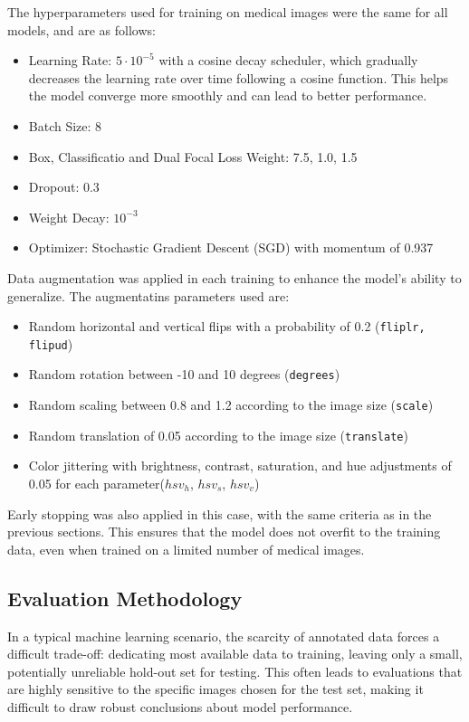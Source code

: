 The hyperparameters used for training on medical images were the same for all models, and are as follows:
\begin{itemize}
    \item Learning Rate: $5 \cdot 10^{-5}$ with a cosine decay scheduler, which gradually decreases the learning rate over time following a cosine function. This helps the model converge more smoothly and can lead to better performance.
    \item Batch Size: 8
    \item Box, Classificatio and Dual Focal Loss Weight: 7.5, 1.0, 1.5
    \item Dropout: 0.3
    \item Weight Decay: $10^{-3}$
    \item Optimizer: Stochastic Gradient Descent (SGD) with momentum of 0.937
\end{itemize}

Data augmentation was applied in each training to enhance the model's ability to generalize. The augmentatins parameters used are:
\begin{itemize}
    \item Random horizontal and vertical flips with a probability of 0.2 (\texttt{fliplr, flipud})
    \item Random rotation between -10 and 10 degrees (\texttt{degrees})
    \item Random scaling between 0.8 and 1.2 according to the image size (\texttt{scale})
    \item Random translation of 0.05 according to the image size (\texttt{translate})
    \item Color jittering with brightness, contrast, saturation, and hue adjustments of 0.05 for each parameter(\texttt{$hsv_h$}, \texttt{$hsv_s$}, \texttt{$hsv_v$}) 
\end{itemize}
Early stopping was also applied in this case, with the same criteria as in the previous sections. This ensures that the model does not overfit to the training data, even when trained on a limited number of medical images.


\subsection{Evaluation Methodology}
In a typical machine learning scenario, the scarcity of annotated data forces a difficult trade-off: dedicating most available data to training, leaving only a small, potentially unreliable hold-out set for testing. This often leads to evaluations that are highly sensitive to the specific images chosen for the test set, making it difficult to draw robust conclusions about model performance.


